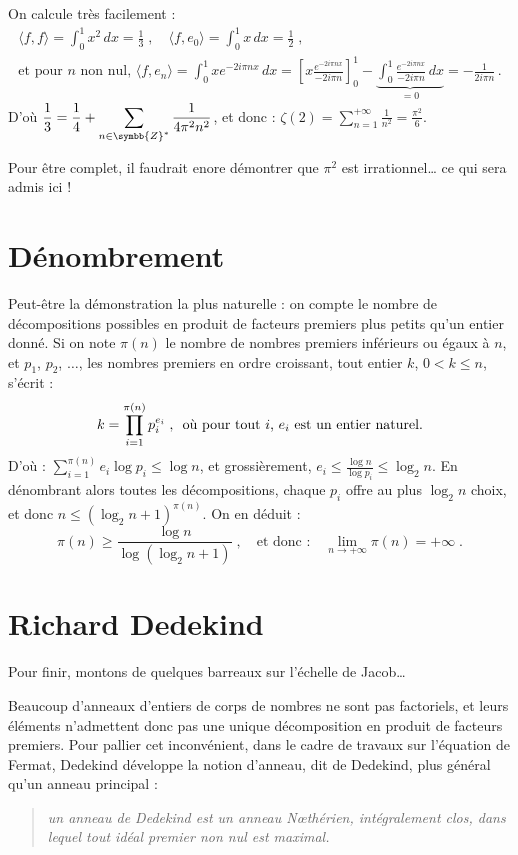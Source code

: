 \documentclass[a4paper,11pt]{article}
\newcommand{\Z}{\ensuremath{\symbb{Z}}\xspace}
\begin{document}
On calcule très facilement :
\begin{gather*}
  \langle f,f \rangle = \int_0^1 x^2\,dx = \frac{1}{3} \;,\quad
  \langle f,e_0 \rangle = \int_0^1 x\,dx = \frac{1}{2} \;, \\
  \mbox{et pour $n$ non nul, }
  \langle f,e_n \rangle = \int_0^1 x e^{-2i\pi n x}\,dx
  =\left[x\frac{e^{-2i\pi n x}}{-2i\pi n}\right]_0^1
  -\underbrace{\int_0^1 \frac{e^{-2i\pi n x}}{-2i\pi n}\,dx}_{=0}
  =-\frac{1}{2i\pi n} \,.
\end{gather*}
D'où\quad
$\displaystyle\frac{1}{3}=\frac{1}{4}+\sum_{n\in\Z^*}\frac{1}{4\pi^2 n^2}$,
\quad et donc :\quad
$\displaystyle\zeta(2)=\sum_{n=1}^{+\infty} \frac{1}{n^2}=\frac{\pi^2}{6}$.

\medskip
Pour être complet, il faudrait enore démontrer que $\pi^2$ est
irrationnel\dots{} ce qui sera admis ici !

\section{Dénombrement}

Peut-être la démonstration la plus naturelle : on compte le nombre de
décompositions possibles en produit de facteurs premiers plus petits qu'un
entier donné. Si on note $\pi(n)$ le nombre de nombres premiers inférieurs
ou égaux à $n$, et $p_1$, $p_2$, $\ldots$, les nombres premiers en ordre
croissant, tout entier $k$, $0<k\le n$, s'écrit :
\[
  k = \prod_{i=1}^{\pi(n)} p_i^{e_i}\;,
  \mbox{\enspace où pour tout $i$, $e_i$ est un entier naturel.}
\]
D'où : $\displaystyle\sum_{i=1}^{\pi(n)} e_i\log p_i \le\log n$,
et grossièrement,
$\displaystyle  e_i\le\frac{\log n}{\log p_i} \le \log_2 n$.
En dénombrant alors toutes les décompositions, chaque $p_i$ offre
au plus $\log_2 n$ choix, et donc
$\displaystyle n \le (\log_2 n + 1)^{\pi(n)}$. On en déduit :
\[
  \pi(n) \ge \frac{\log n}{\log(\log_2 n +1)}\;,\quad\mbox{et donc :}\quad
  \lim_{n\to+\infty}\pi(n) = +\infty\;.
\]

\section{Richard Dedekind}

Pour finir, montons de quelques barreaux sur l'échelle de Jacob\dots

\noindent
Beaucoup d'anneaux d'entiers de corps de nombres ne sont pas factoriels,
et leurs éléments n'admettent donc pas une unique décomposition en produit de
facteurs premiers. Pour pallier cet inconvénient, dans le cadre de travaux
sur l'équation de Fermat, Dedekind développe la notion d'anneau,
dit de Dedekind, plus général qu'un anneau principal :
\begin{quotation}
  \noindent\itshape
  un anneau de Dedekind est un anneau Nœthérien, intégralement clos,
  dans lequel tout idéal premier non nul est maximal.
\end{quotation}
\end{document}
